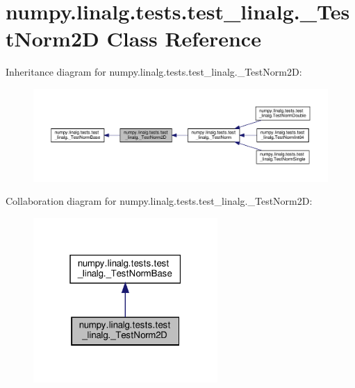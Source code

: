 \hypertarget{classnumpy_1_1linalg_1_1tests_1_1test__linalg_1_1__TestNorm2D}{}\section{numpy.\+linalg.\+tests.\+test\+\_\+linalg.\+\_\+\+Test\+Norm2D Class Reference}
\label{classnumpy_1_1linalg_1_1tests_1_1test__linalg_1_1__TestNorm2D}


Inheritance diagram for numpy.\+linalg.\+tests.\+test\+\_\+linalg.\+\_\+\+Test\+Norm2D\+:
\nopagebreak
\begin{figure}[H]
\begin{center}
\leavevmode
\includegraphics[width=350pt]{classnumpy_1_1linalg_1_1tests_1_1test__linalg_1_1__TestNorm2D__inherit__graph}
\end{center}
\end{figure}


Collaboration diagram for numpy.\+linalg.\+tests.\+test\+\_\+linalg.\+\_\+\+Test\+Norm2D\+:
\nopagebreak
\begin{figure}[H]
\begin{center}
\leavevmode
\includegraphics[width=199pt]{classnumpy_1_1linalg_1_1tests_1_1test__linalg_1_1__TestNorm2D__coll__graph}
\end{center}
\end{figure}

